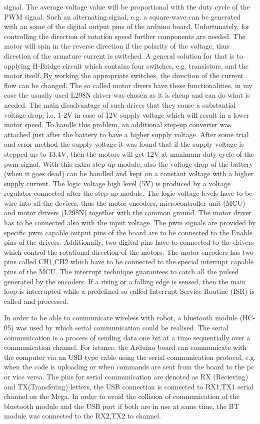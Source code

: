 \documentclass[12pt,english]{article}
\begin{document}
signal.\cite{dc_motor_3} \cite{dc_motor_4} The average voltage value will be proportional with the duty cycle of the PWM signal. Such an alternating signal, e.g. a square-wave can be generated with an some of the digital output pins of the arduino board. Unfortunately, for controlling the direction of rotation speed further components are needed. The motor will spin in the reverse direction if the polarity of the voltage, thus direction of the armature current is switched. A general solution for that is to applying H-Bridge circuit which contains four switches, e.g. transistors, and the motor itself. By working the appropriate switches, the direction of the current flow can be changed. \cite{howtomech}
The so called motor divers have these functionalities, in my case the usually used L298N driver was chosen as it is cheap and can do what is needed. The main disadvantage of such drives that they cause a substantial voltage drop, i.e. 1-2V in case of 12V supply voltage which will result in a lower motor speed. To handle this problem, an additional step-up converter was attached just after the battery to have a higher supply voltage. After some trial and error method the supply voltage it was found that if the supply voltage is stepped up to 13.4V, then the motors will get 12V at maximum duty cycle of the pwm signal. With this extra step up module, also the voltage drop of the battery (when it goes dead) can be handled and kept on a constant voltage with a higher supply current. The logic voltage high level (5V) is produced by a voltage regulator connected after the step-up module. The logic voltage levels have to be wire into all the devices, thus the motor encoders, microcontroller unit (MCU) and motor drivers (L298N) together with the common ground. The motor driver has to be connected also with the input voltage. The pwm signals are provided by specific pwm capable output pins of the board are to be connected to the Enable pins of the drivers. Additionally, two digital pins have to connected to the drivers which control the rotational direction of the motors. The motor encoders has two pins called CH1,CH2 which have to be connected to the special interrupt capable pins of the MCU. The interrupt technique guarantees to catch all the pulsed generated by the encoders. If a rising or a falling edge is sensed, then the main loop is interrupted while a predefined so called Interrupt Service Routine (ISR) is called and processed. 

In order to be able to communicate wireless with robot, a bluetooth module (HC-05) was used by which serial communication could be realised. The serial communication is a process of sending data one bit at a time sequentially over a communication channel. For istance, the Arduino board can communicate with the computer via an USB type cable using the serial communication protocol, e.g. when the code is uploading or when commands are sent from the board to the pc or vice versa. The pins for serial communication are denoted as RX (Recieving) and TX(Transfering) letters, the USB connection is connected to RX1,TX1 serial channel on the Mega. In order to avoid the collision of communication of the bluetooth module and the USB port if both are in use at same time, the BT module was connected to the RX2,TX2 to channel.
\newpage
\end{document}
